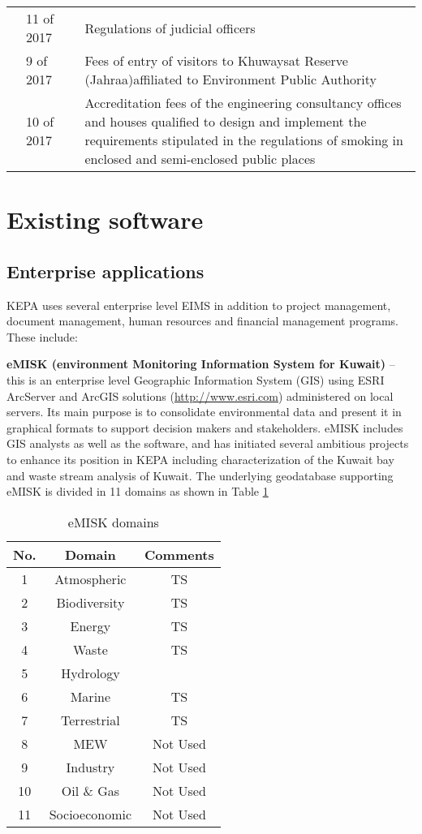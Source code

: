 \begin{table}[H]
{\begin{tabular}{@{}p{2cm}p{2cm}cp{8cm}@{}}
 & 11 of 2017 &  & Regulations of judicial officers \\
 & 9 of 2017 &  & Fees of entry of visitors to Khuwaysat Reserve (Jahraa)affiliated to Environment Public Authority \\
 & 10 of 2017 &  & Accreditation fees of the engineering consultancy offices and houses qualified to design and implement the requirements stipulated in the regulations of smoking in enclosed and semi-enclosed public places \\ \bottomrule
\end{tabular}
} %
\end{table}


\section{Existing software}
\subsection{Enterprise applications}

KEPA uses several enterprise level EIMS in addition to project management, document management, human resources and financial management programs. These include:

\textbf{eMISK (environment Monitoring Information System for Kuwait)} – this is an enterprise level Geographic Information System (GIS) using ESRI ArcServer and ArcGIS solutions (\url{http://www.esri.com}) administered on local servers. Its main purpose is to consolidate environmental data and present it in graphical formats to support decision makers and stakeholders. eMISK includes GIS analysts as well as the software, and has initiated several ambitious projects to enhance its position in KEPA including characterization of the Kuwait bay and waste stream analysis of Kuwait. The underlying geodatabase supporting eMISK is divided in 11 domains as shown in Table \ref{tab:emiskdomains}

\begin{table}[!htpb]
\centering
\caption{eMISK domains}
\label{tab:emiskdomains}
\begin{tabular}{@{}ccc@{}}
\toprule
\textbf{No.} & \textbf{Domain} & Comments \\ \midrule
1 & Atmospheric & TS \\
2 & Biodiversity & TS\\
3 & Energy & TS \\
4 & Waste & TS\\
5 & Hydrology \\
6 & Marine & TS\\
7 & Terrestrial & TS \\
8 & MEW & Not Used \\
9 & Industry & Not Used\\
10 & Oil \& Gas & Not Used\\
11 & Socioeconomic & Not Used\\ \bottomrule
\end{tabular}
\end{table}

